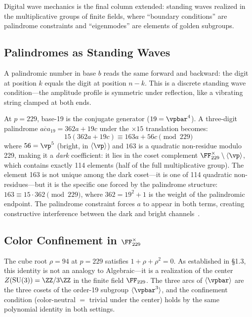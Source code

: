 Digital wave mechanics is the final column extended: standing waves realized in the multiplicative groups of finite fields, where ``boundary conditions'' are palindrome constraints and ``eigenmodes'' are elements of golden subgroups.

\subsection{Palindromes as Standing Waves}

A palindromic number in base $b$ reads the same forward and backward: the digit at position $k$ equals the digit at position $n - k$. This is a discrete standing wave condition---the amplitude profile is symmetric under reflection, like a vibrating string clamped at both ends.

At $p = 229$, base-19 is the conjugate generator ($19 = \vpbar^4$). A three-digit palindrome $\overline{aca}_{19} = 362a + 19c$ under the $\times 15$ translation becomes:
\[
15(362a + 19c) \equiv 163a + 56c \pmod{229}
\]
where $56 = \vp^5$ (bright, in $\langle \vp \rangle$) and $163$ is a quadratic non-residue modulo 229, making it a \emph{dark} coefficient: it lies in the coset complement $\FF_{229}^\times \setminus \langle \vp \rangle$, which contains exactly 114 elements (half of the full multiplicative group). The element 163 is not unique among the dark coset---it is one of 114 quadratic non-residues---but it is the specific one forced by the palindrome structure: $163 \equiv 15 \cdot 362 \pmod{229}$, where $362 = 19^2 + 1$ is the weight of the palindromic endpoint. The palindrome constraint forces $a$ to appear in both terms, creating constructive interference between the dark and bright channels~\cite{larue_chromatic}.

\subsection{Color Confinement in $\FF_{229}^\times$}

The cube root $\rho = 94$ at $p = 229$ satisfies $1 + \rho + \rho^2 = 0$. As established in \S1.3, this identity is not an analogy to Algebraic---it is a realization of the center $Z(\mathrm{SU}(3)) = \ZZ/3\ZZ$ in the finite field $\FF_{229}$. The three arcs of $\langle \vpbar \rangle$ are the three cosets of the order-19 subgroup $\langle \vpbar^3 \rangle$, and the confinement condition (color-neutral $=$ trivial under the center) holds by the same polynomial identity in both settings.

